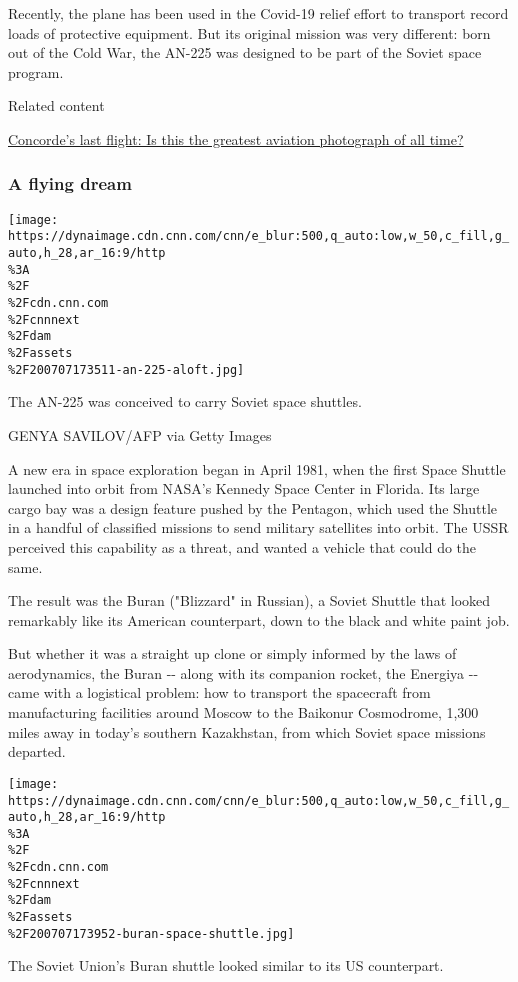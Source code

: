 Recently, the plane has been used in the Covid-19 relief effort to
transport record loads of protective equipment. But its original mission
was very different: born out of the Cold War, the AN-225 was designed to
be part of the Soviet space program.

Related content

\href{/travel/article/concorde-last-flight-photo/index.html}{Concorde's
last flight: Is this the greatest aviation photograph of all time?}

\hypertarget{a-flying-dream}{%
\subsubsection{A flying dream}\label{a-flying-dream}}

\texttt{[image: https://dynaimage.cdn.cnn.com/cnn/e\_blur:500,q\_auto:low,w\_50,c\_fill,g\_auto,h\_28,ar\_16:9/http\\\%3A\\\%2F\\\%2Fcdn.cnn.com\\\%2Fcnnnext\\\%2Fdam\\\%2Fassets\\\%2F200707173511-an-225-aloft.jpg]}

The AN-225 was conceived to carry Soviet space shuttles.

GENYA SAVILOV/AFP via Getty Images

A new era in space exploration began in April 1981, when the first Space
Shuttle launched into orbit from NASA's Kennedy Space Center in Florida.
Its large cargo bay was a design feature pushed by the Pentagon, which
used the Shuttle in a handful of classified missions to send military
satellites into orbit. The USSR perceived this capability as a threat,
and wanted a vehicle that could do the same.

The result was the Buran ("Blizzard" in Russian), a Soviet Shuttle that
looked remarkably like its American counterpart, down to the black and
white paint job.

But whether it was a straight up clone or simply informed by the laws of
aerodynamics, the Buran -\/- along with its companion rocket, the
Energiya -\/- came with a logistical problem: how to transport the
spacecraft from manufacturing facilities around Moscow to the Baikonur
Cosmodrome, 1,300 miles away in today's southern Kazakhstan, from which
Soviet space missions departed.

\texttt{[image: https://dynaimage.cdn.cnn.com/cnn/e\_blur:500,q\_auto:low,w\_50,c\_fill,g\_auto,h\_28,ar\_16:9/http\\\%3A\\\%2F\\\%2Fcdn.cnn.com\\\%2Fcnnnext\\\%2Fdam\\\%2Fassets\\\%2F200707173952-buran-space-shuttle.jpg]}

The Soviet Union's Buran shuttle looked similar to its US counterpart.

